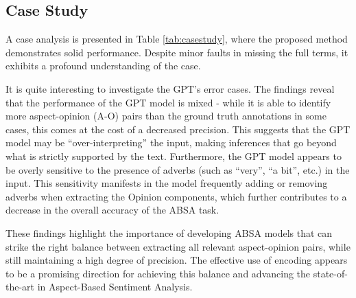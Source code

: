 \documentclass[11pt]{article}
\begin{document}
\subsection{Case Study}
A case analysis is presented in Table \ref{tab:casestudy}, where the proposed method demonstrates solid performance. Despite minor faults in missing the full terms, it exhibits a profound understanding of the case. 

It is quite interesting to investigate the GPT's error cases. 
The findings reveal that the performance of the GPT model is mixed - while it is able to identify more aspect-opinion (A-O) pairs than the ground truth annotations in some cases, this comes at the cost of a decreased precision. This suggests that the GPT model may be ``over-interpreting'' the input, making inferences that go beyond what is strictly supported by the text.
Furthermore, the GPT model appears to be overly sensitive to the presence of adverbs (such as ``very'', ``a bit'', etc.) in the input. This sensitivity manifests in the model frequently adding or removing adverbs when extracting the Opinion components, which further contributes to a decrease in the overall accuracy of the ABSA task.

These findings highlight the importance of developing ABSA models that can strike the right balance between extracting all relevant aspect-opinion pairs, while still maintaining a high degree of precision. The effective use of encoding appears to be a promising direction for achieving this balance and advancing the state-of-the-art in Aspect-Based Sentiment Analysis.







\end{document}
